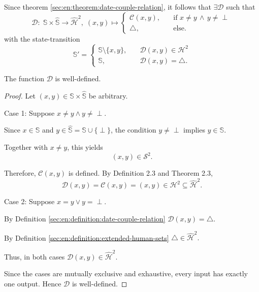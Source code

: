 \begin{definition}\label{sec:en:definition:date-couple-relation}
    Since theorem \ref{sec:en:theorem:date-couple-relation}, it follows that $\exists\mathcal{D}$ such that
    $$\mathcal{D}:\;\mathbb{S}\times\hat{\mathbb{S}}\rightarrow\hat{\mathcal{H}}^2,\;(x,y)\mapsto\begin{cases}\mathcal{C}(x,y),\quad &\text{if }x\neq y\,\land\,y\neq\perp \\ \triangle,\quad &\text{else.}\end{cases}$$
    with the state-transition 
    $$\mathbb{S}'=\begin{cases} \mathbb{S}\setminus\{x,y\},\quad &\mathcal{D}(x,y)\in\mathcal{H}^2 \\ \mathbb{S},\quad &\mathcal{D}(x,y)=\triangle. \end{cases}$$
\end{definition}

\begin{proposition}\label{sec:en:prop:well-def-dcr}
    \begin{statement}
        The function $\mathcal D$ is well-defined.
    \end{statement}
    \begin{proof}
        Let $(x,y)\in\mathbb S\times\hat{\mathbb S}$ be arbitrary.

        Case 1: Suppose $x\neq y\land y\neq\perp$.

        Since $x\in\mathbb S$ and $y\in\hat{\mathbb S}=\mathbb S\cup\{\perp\}$, the condition $y\neq\perp$ implies $y\in\mathbb S$.

        Together with $x\neq y$, this yields
        $$(x,y)\in\mathcal S^{2}.$$

        Therefore, $\mathcal C(x,y)$ is defined. By Definition 2.3 and Theorem 2.3,
        $$\mathcal D(x,y)=\mathcal C(x,y)
            =(x,y)\in\mathcal H^{2}
            \subseteq\hat{\mathcal H}^{2}.
            $$

        Case 2: Suppose $x=y\lor y=\perp$.

        By Definition \ref{sec:en:definition:date-couple-relation} $\mathcal D(x,y)=\triangle.$

        By Definition \ref{sec:en:definition:extended-human-sets} $\triangle\in\hat{\mathcal H}^{2}.$

        Thus, in both cases $\mathcal D(x,y)\in\hat{\mathcal H}^{2}.$

        Since the cases are mutually exclusive and exhaustive, every input has exactly one output. Hence $\mathcal D$ is well-defined.
    \end{proof}
\end{proposition}

